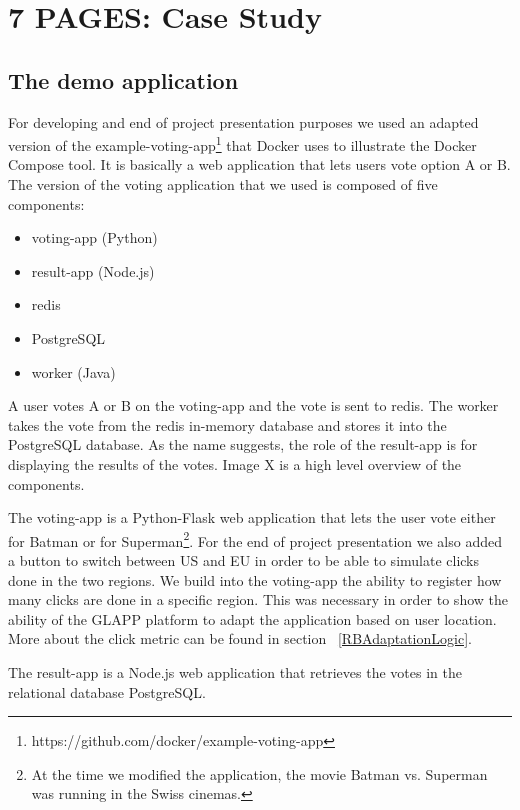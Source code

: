 \documentclass{seal_thesis}
\begin{document}
\chapter{7 PAGES: Case Study}\label{ch:casestudy}

\section{The demo application}
For developing and end of project presentation purposes we used an adapted version of the example-voting-app\footnote{https://github.com/docker/example-voting-app} that Docker uses to illustrate the Docker Compose tool.
It is basically a web application that lets users vote option A or B.
The version of the voting application that we used is composed of five components:
\begin{itemize}
	\item voting-app (Python)
	\item result-app (Node.js)
	\item redis
	\item PostgreSQL
	\item worker (Java)
\end{itemize}
A user votes A or B on the voting-app and the vote is sent to redis.
The worker takes the vote from the redis in-memory database and stores it into the PostgreSQL database.
As the name suggests, the role of the result-app is for displaying the results of the votes.
Image X is a high level overview of the components.

The voting-app is a Python-Flask web application that lets the user vote either for Batman or for Superman\footnote{At the time we modified the application, the movie Batman vs. Superman was running in the Swiss cinemas.}.
For the end of project presentation we also added a button to switch between US and EU in order to be able to simulate clicks done in the two regions.
We build into the voting-app the ability to register how many clicks are done in a specific region.
This was necessary in order to show the ability of the GLAPP platform to adapt the application based on user location.
More about the click metric can be found in section ~\ref{RBAdaptationLogic}.

The result-app is a Node.js web application that retrieves the votes in the relational database PostgreSQL.
\end{document}

